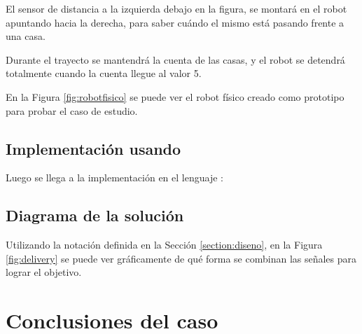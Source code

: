   El sensor de distancia a la izquierda debajo en la figura, se montará
en el robot apuntando hacia la derecha, para saber cuándo el mismo
está pasando frente a una casa.

  Durante el trayecto se mantendrá la cuenta de las casas, y el robot
se detendrá totalmente cuando la cuenta llegue al valor 5.

  En la Figura \ref{fig:robotfisico} se puede ver el
robot físico creado como prototipo para probar el caso de estudio.



\newpage
\subsection{Implementación usando \frob{}}
  Luego se llega a la implementación en el lenguaje \frob{}:



\subsection{Diagrama de la solución}
  Utilizando la notación definida en la Sección \ref{section:diseno},
en la Figura \ref{fig:delivery} se puede ver gráficamente de qué forma
se combinan las señales para lograr el objetivo.









\section {Conclusiones del caso}


